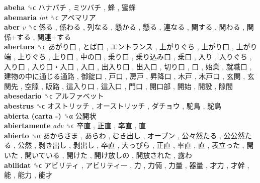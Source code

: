 \textbf{abeha} ␝ϲ   ハナバチ ,  ミツバチ ,  蜂 ,  蜜蜂   \\
\textbf{abemaria} \emph{int}  ␝ϲ   アベマリア   \\
\textbf{aber} \emph{v}  ␝ϲ   係る ,  係わる ,  列なる ,  懸かる ,  懸る ,  連なる ,  関する ,  関わる ,  関係+する ,  関連+する   \\
\textbf{abertura} ␝ϲ   あがり口 ,  とば口 ,  エントランス ,  上がりぐち ,  上がり口 ,  上がり端 ,  上りぐち ,  上り口 ,  中の口 ,  乗り口 ,  乗り込み口 ,  乗口 ,  入り ,  入りぐち ,  入り口 ,  入り口・入口 ,  入口 ,  出入り口 ,  出入口 ,  切り口 ,  口 ,  始業 ,  就職口 ,  建物の中に通じる通路 ,  御錠口 ,  戸口 ,  房戸 ,  昇降口 ,  木戸 ,  木戸口 ,  玄関 ,  玄関先 ,  空隙 ,  販路 ,  這入り口 ,  這入口 ,  門口 ,  開口部 ,  開始 ,  開設 ,  隙間   \\
\textbf{abesedario} ␝ϲ   アルファベット   \\
\textbf{abestrus} ␝ϲ   オストリッチ ,  オーストリッチ ,  ダチョウ ,  駝鳥 ,  鴕鳥   \\
\textbf{abierta (carta -)} ␝α   公開状   \\
\textbf{abiertamente} \emph{adv}  ␝ϲ   卒直 ,  正直 ,  率直 ,  直   \\
\textbf{abierto} ␝α   あからさま ,  あらわ ,  むき出し ,  オープン ,  公々然たる ,  公公然たる ,  公然 ,  剥き出し ,  剥出し ,  卒直 ,  大っぴら ,  正直 ,  率直 ,  直 ,  表立った ,  開いた ,  開いている ,  開けた ,  開け放しの ,  開放された ,  露わ   \\
\textbf{abilidat} ␝ϲ   アビリティ ,  アビリティー ,  力 ,  力倆 ,  力量 ,  器量 ,  才力 ,  才幹 ,  能 ,  能力 ,  能才   \\
